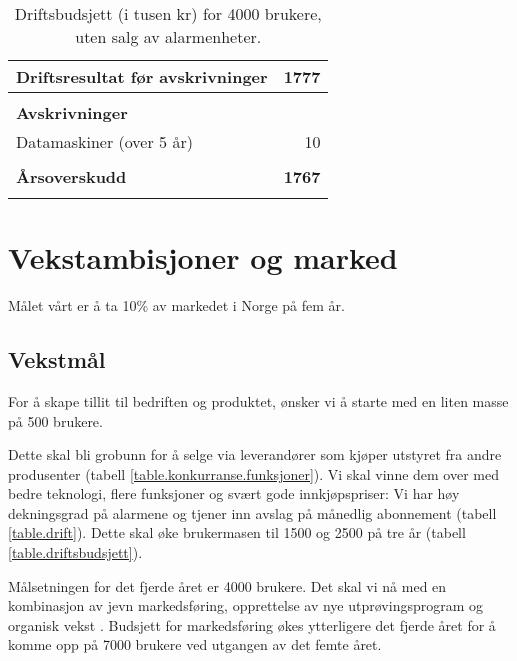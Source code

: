 \begin{table}
\begin{tabular}{lr}
    \\
    \textbf{Driftsresultat før avskrivninger}         &  \textbf{1777} \\
    \hline
    \\
    \textbf{Avskrivninger}                            & \\
    Datamaskiner (over 5 år)                          &    10 \\
    \\
    \textbf{Årsoverskudd}                             &  \textbf{1767} \\
    \thickhline
    \\
  \end{tabular}
  \caption{Driftsbudsjett (i tusen kr) for 4000 brukere, uten salg av alarmenheter.}
  \label{table.drift}
\end{table}

\section{Vekstambisjoner og marked}

Målet vårt er å ta 10\% av markedet i Norge på fem år.

\subsection{Vekstmål}


For å skape tillit til bedriften og produktet, ønsker vi å starte med en liten
masse på 500 brukere.

Dette skal bli grobunn for å selge via leverandører som kjøper utstyret fra
andre produsenter (tabell \vref{table.konkurranse.funksjoner}).  Vi skal vinne
dem over med bedre teknologi, flere funksjoner og svært gode innkjøpspriser: Vi
har høy dekningsgrad på alarmene og tjener inn avslag på månedlig abonnement
(tabell \vref{table.drift}).  Dette skal øke brukermasen til 1500 og 2500 på
tre år (tabell \vref{table.driftsbudsjett}).

Målsetningen for det fjerde året er 4000 brukere. Det skal vi nå med en
kombinasjon av jevn markedsføring, opprettelse av nye utprøvingsprogram og
organisk vekst \cite{bessant}.  Budsjett for markedsføring økes ytterligere det
fjerde året for å komme opp på 7000 brukere ved utgangen av det femte året.

